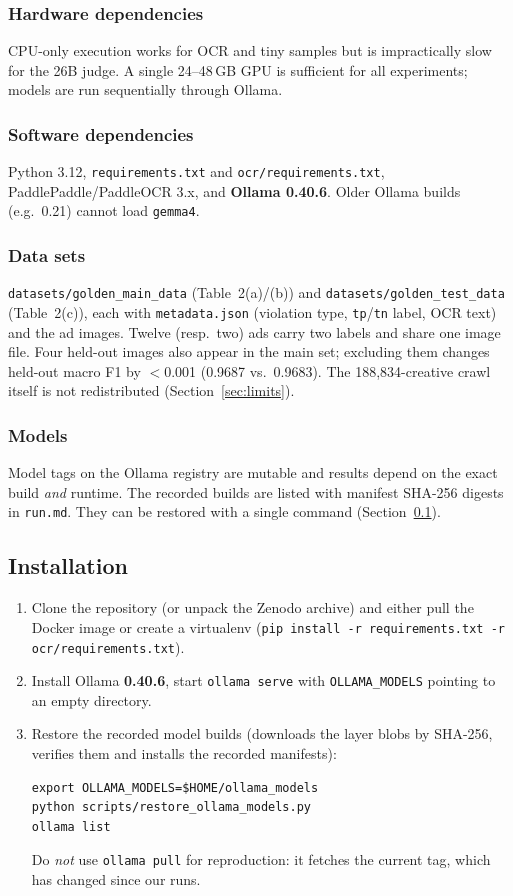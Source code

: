 \documentclass[sigconf,nonacm]{acmart}
\begin{document}
\subsubsection{Hardware dependencies}
CPU-only execution works for OCR and tiny samples but is impractically slow for the 26B judge. A single
24--48\,GB GPU is sufficient for all experiments; models are run sequentially through Ollama.

\subsubsection{Software dependencies}
Python 3.12, \texttt{requirements.txt} and \texttt{ocr/requirements.txt}, PaddlePaddle/PaddleOCR 3.x, and
\textbf{Ollama 0.40.6}. Older Ollama builds (e.g.\ 0.21) cannot load \texttt{gemma4}.

\subsubsection{Data sets}
\texttt{datasets/golden\_main\_data} (Table~2(a)/(b)) and \texttt{datasets/golden\_test\_data} (Table~2(c)),
each with \texttt{metadata.json} (violation type, \texttt{tp}/\texttt{tn} label, OCR text) and the ad images.
Twelve (resp.\ two) ads carry two labels and share one image file. Four held-out images also appear in the
main set; excluding them changes held-out macro F1 by $<$0.001 (0.9687 vs.\ 0.9683).
The 188{,}834-creative crawl itself is not redistributed (Section~\ref{sec:limits}).

\subsubsection{Models}
Model tags on the Ollama registry are mutable and results depend on the exact build \emph{and} runtime.
The recorded builds are listed with manifest SHA-256 digests in \texttt{run.md}. They can be restored with a
single command (Section~\ref{sec:setup}).

\subsection{Installation}\label{sec:setup}
\begin{enumerate}
  \item Clone the repository (or unpack the Zenodo archive) and either pull the Docker image or create a virtualenv
        (\texttt{pip install -r requirements.txt -r ocr/requirements.txt}).
  \item Install Ollama \textbf{0.40.6}, start \texttt{ollama serve} with \texttt{OLLAMA\_MODELS} pointing to an empty directory.
  \item Restore the recorded model builds (downloads the layer blobs by SHA-256, verifies them and installs the recorded manifests):
\begin{verbatim}
export OLLAMA_MODELS=$HOME/ollama_models
python scripts/restore_ollama_models.py
ollama list
\end{verbatim}
        Do \emph{not} use \texttt{ollama pull} for reproduction: it fetches the current tag, which has changed since our runs.
\end{enumerate}
\end{document}
